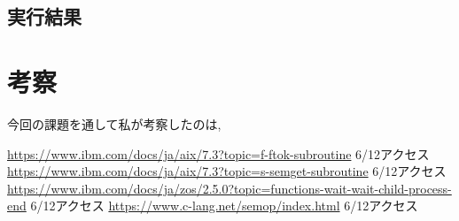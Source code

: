 \documentclass[dvipdfmx]{jarticle}
\begin{document}
\subsection{実行結果}

\section{考察}
今回の課題を通して私が考察したのは,
\begin{thebibliography}{99}
     \url{https://www.ibm.com/docs/ja/aix/7.3?topic=f-ftok-subroutine} 6/12アクセス
     \url{https://www.ibm.com/docs/ja/aix/7.3?topic=s-semget-subroutine} 6/12アクセス
     \url{https://www.ibm.com/docs/ja/zos/2.5.0?topic=functions-wait-wait-child-process-end} 6/12アクセス
     \url{https://www.c-lang.net/semop/index.html} 6/12アクセス
\end{thebibliography}
\end{document}

